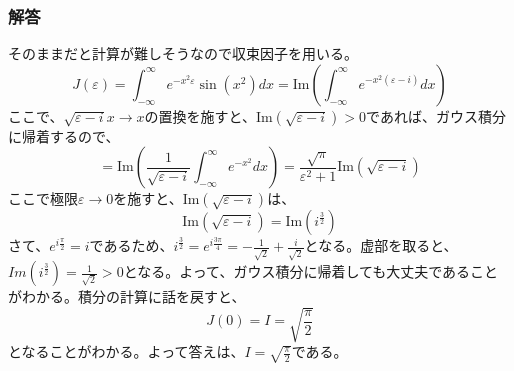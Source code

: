 \documentclass[a4j,dvipdfmx]{jsarticle}
\begin{document}
\subsubsection*{解答}
そのままだと計算が難しそうなので収束因子を用いる。
\begin{equation*}
    J(\varepsilon)=\int_{-\infty}^{\infty}e^{-x^2\varepsilon}\sin(x^2)dx=\mbox{Im}\left(\int_{-\infty}^{\infty}e^{-x^2(\varepsilon-i)}dx\right)
\end{equation*}
ここで、$\sqrt{\varepsilon-i}x\to x$の置換を施すと、$\mbox{Im}(\sqrt{\varepsilon-i})>0$であれば、ガウス積分に帰着するので、
\begin{equation*}
    =\mbox{Im}\left(\frac{1}{\sqrt{\varepsilon-i}}\int_{-\infty}^{\infty}e^{-x^2}dx\right)=\frac{\sqrt{\pi}}{\varepsilon^2+1}\mbox{Im}\left(\sqrt{\varepsilon-i}\right)
\end{equation*}
ここで極限$\varepsilon\to 0$を施すと、$\mbox{Im}(\sqrt{\varepsilon-i})$は、
\begin{equation*}
    \mbox{Im}(\sqrt{\varepsilon-i})=\mbox{Im}(i^{\frac{3}{2}})
\end{equation*}
さて、$\displaystyle e^{i\frac{\pi}{2}}=i$であるため、$i^{\frac{3}{2}}=e^{i\frac{3\pi}{4}}=-\frac{1}{\sqrt{2}}+\frac{i}{\sqrt{2}}$となる。虚部を取ると、
$Im(i^{\frac{3}{2}})=\frac{1}{\sqrt{2}}>0$となる。よって、ガウス積分に帰着しても大丈夫であることがわかる。積分の計算に話を戻すと、
\begin{equation*}
    J(0)=I=\sqrt{\frac{\pi}{2}}
\end{equation*}
となることがわかる。よって答えは、$\displaystyle I=\sqrt{\frac{\pi}{2}}$である。\\
\end{document}

